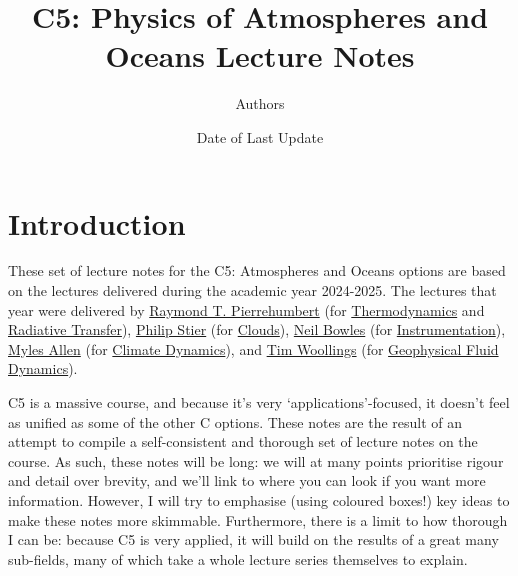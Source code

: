 \documentclass[a4paper,11pt]{report}
\title{C5: Physics of Atmospheres and Oceans Lecture Notes}
\author{Authors}
\date{Date of Last Update}
\begin{document}
\begin{titlingpage}
\maketitle
\end{titlingpage}

\tableofcontents

\newpage

\begin{sloppypar}

\section*{Introduction}

These set of lecture notes for the C5: Atmospheres and Oceans options are based on the lectures delivered during the academic year 2024-2025. The lectures that year were delivered by 
\href{https://users.physics.ox.ac.uk/~pierrehumbert/}{Raymond T. Pierrehumbert} 
(for \hyperref[Thermodynamics]{Thermodynamics} and \hyperref[Radiative Transfer]{Radiative Transfer}), 
\href{https://www.physics.ox.ac.uk/our-people/stier}{Philip Stier} 
(for \hyperref[Clouds]{Clouds}), 
\href{https://www.physics.ox.ac.uk/our-people/bowles}{Neil Bowles} 
(for \hyperref[Instrumentation]{Instrumentation}), 
\href{https://www.physics.ox.ac.uk/our-people/allenm}{Myles Allen} 
(for \hyperlink{Climate Dynamics}{Climate Dynamics}), and \href{https://www.physics.ox.ac.uk/our-people/woollings}{Tim Woollings} 
(for \hyperref[Geophysical Fluid Dynamics]{Geophysical Fluid Dynamics}).

C5 is a massive course, and because it's very `applications'-focused, it doesn't feel as unified as some of the other C options. These notes are the result of an attempt to compile a self-consistent and thorough set of lecture notes on the course. As such, these notes will be long: we will at many points prioritise rigour and detail over brevity, and we'll link to where you can look if you want more information. However, I will try to emphasise (using coloured boxes!) key ideas to make these notes more skimmable. Furthermore, there is a limit to how thorough I can be: because C5 is very applied, it will build on the results of a great many sub-fields, many of which take a whole lecture series themselves to explain.


\end{sloppypar}
\end{document}
